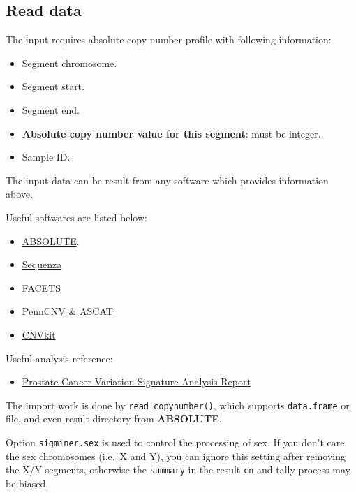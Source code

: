 \documentclass[
  12pt,
  a4paper,
  twoside]{book}
\providecommand{\tightlist}{%
  \setlength{\itemsep}{0pt}\setlength{\parskip}{0pt}}
\begin{document}
\hypertarget{read-data}{%
\subsection{Read data}\label{read-data}}

The input requires absolute copy number profile with following information:

\begin{itemize}
\tightlist
\item
  Segment chromosome.
\item
  Segment start.
\item
  Segment end.
\item
  \textbf{Absolute copy number value for this segment}: must be integer.
\item
  Sample ID.
\end{itemize}

The input data can be result from any software which provides information above.

Useful softwares are listed below:

\begin{itemize}
\tightlist
\item
  \href{https://software.broadinstitute.org/cancer/cga/absolute}{ABSOLUTE}.
\item
  \href{https://cran.r-project.org/web/packages/sequenza/index.html}{Sequenza}
\item
  \href{https://github.com/mskcc/facets}{FACETS}
\item
  \href{http://penncnv.openbioinformatics.org/en/latest/}{PennCNV} \& \href{https://www.crick.ac.uk/research/labs/peter-van-loo/software}{ASCAT}
\item
  \href{https://github.com/etal/cnvkit}{CNVkit}
\end{itemize}

Useful analysis reference:

\begin{itemize}
\tightlist
\item
  \href{https://xsliulab.github.io/PC_CNA_signature/}{Prostate Cancer Variation Signature Analysis Report}
\end{itemize}

The import work is done by \texttt{read\_copynumber()}, which supports \texttt{data.frame} or file, and even result directory from \textbf{ABSOLUTE}.

Option \texttt{sigminer.sex} is used to control the processing of sex. If you don't care the sex chromosomes (i.e.~X and Y),
you can ignore this setting after removing the X/Y segments, otherwise the \texttt{summary} in the result \texttt{cn} and tally process may be biased.
\end{document}
